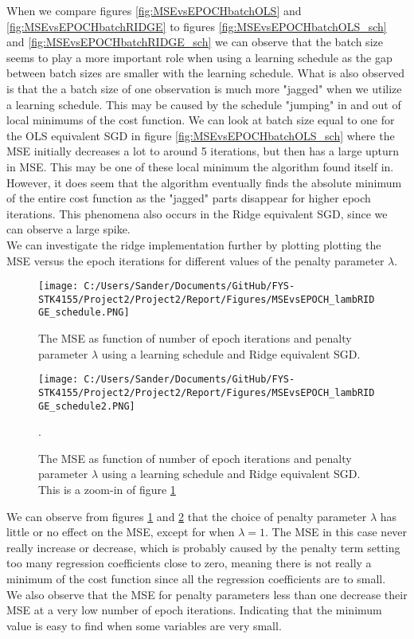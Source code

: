 \documentclass[12pt,a4paper]{article}
\begin{document}
\noindent When we compare figures \ref{fig:MSEvsEPOCHbatchOLS} and \ref{fig:MSEvsEPOCHbatchRIDGE} to figures \ref{fig:MSEvsEPOCHbatchOLS_sch} and \ref{fig:MSEvsEPOCHbatchRIDGE_sch} we can observe that the batch size seems to play a more important role when using a learning schedule as the gap between batch sizes are smaller with the learning schedule. What is also observed is that the a batch size of one observation is much more "jagged" when we utilize a learning schedule. This may be caused by the schedule "jumping" in and out of local minimums of the cost function. We can look at batch size equal to one for the OLS equivalent SGD in figure \ref{fig:MSEvsEPOCHbatchOLS_sch} where the MSE initially decreases a lot to around 5 iterations, but then has a large upturn in MSE. This may be one of these local minimum the algorithm found itself in. However, it does seem that the algorithm eventually finds the absolute minimum of the entire cost function as the "jagged" parts disappear for higher epoch iterations. This phenomena also occurs in the Ridge equivalent SGD, since we can observe a large spike. 
\\
We can investigate the ridge implementation further by plotting plotting the MSE versus the epoch iterations for different values of the penalty parameter $\lambda$.

\begin{figure}[H]
\centering
\texttt{[image: C:/Users/Sander/Documents/GitHub/FYS-STK4155/Project2/Project2/Report/Figures/MSEvsEPOCH\_lambRIDGE\_schedule.PNG]}
\caption{\label{fig:MSEvsEPOCHlambRIDGE_sch} The MSE as function of number of epoch iterations and penalty parameter $\lambda$ using a learning schedule and Ridge equivalent SGD.}
\end{figure}

\begin{figure}[H]
\centering
\texttt{[image: C:/Users/Sander/Documents/GitHub/FYS-STK4155/Project2/Project2/Report/Figures/MSEvsEPOCH\_lambRIDGE\_schedule2.PNG]}
\caption{\label{fig:MSEvsEPOCHlambRIDGE_sch2} The MSE as function of number of epoch iterations and penalty parameter $\lambda$ using a learning schedule and Ridge equivalent SGD. This is a zoom-in of figure \ref{fig:MSEvsEPOCHlambRIDGE_sch}}.
\end{figure}

\noindent We can observe from figures \ref{fig:MSEvsEPOCHlambRIDGE_sch} and \ref{fig:MSEvsEPOCHlambRIDGE_sch2} that the choice of penalty parameter $\lambda$ has little or no effect on the MSE, except for when $\lambda = 1$. The MSE in this case never really increase or decrease, which is probably caused by the penalty term setting too many regression coefficients close to zero, meaning there is not really a minimum of the cost function since all the regression coefficients are to small. 
\\
We also observe that the MSE for penalty parameters less than one decrease their MSE at a very low number of epoch iterations. Indicating that the minimum value is easy to find when some variables are very small.
\end{document}
